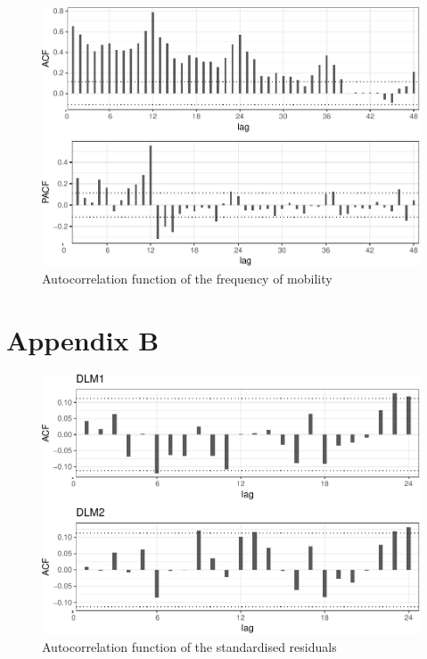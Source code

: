 \documentclass[12pt, a4paper]{article}
\begin{document}
\begin{figure}[H]
  \caption{\label{fig:autocorr-plot}Autocorrelation function of the frequency
of mobility}
\centering
\includegraphics[scale = 0.8]{../figs/freq--autocorr-plot-1.pdf}
\end{figure}

\section*{Appendix B}\label{appendix-b}

\begin{figure}[H]
  \caption{\label{fig:residual-autocorr}Autocorrelation function of the
standardised residuals}
\centering
\includegraphics[scale = 0.8]{../figs/freq--residual-autocorr-1.pdf}
\end{figure}
\end{document}
